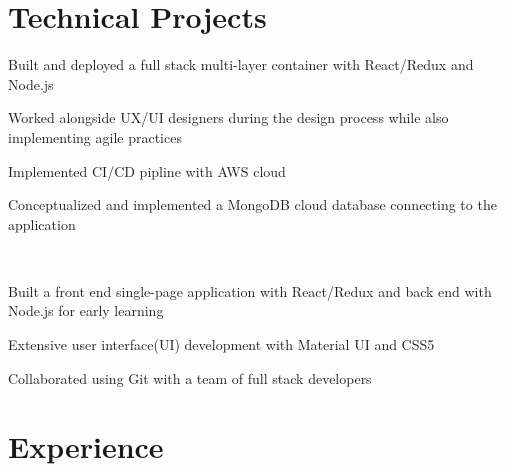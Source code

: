 \documentclass[]{deedy-resume-openfont}
\begin{document}
\hfill
\begin{minipage}[t]{4in} 


\section{Technical Projects}
\vspace{\topsep} %
\begin{tightemize}
\item Built and deployed a full stack multi-layer container with React/Redux and Node.js
\item Worked alongside UX/UI designers during the design process while also implementing agile practices
\item Implemented CI/CD pipline with AWS cloud
\item Conceptualized and implemented a MongoDB cloud database connecting to the application
\end{tightemize}
\sectionsep

 \\
\vspace{\topsep}
\begin{tightemize}
\item Built a front end single-page application with React/Redux and back end with Node.js for early learning \\
\item Extensive user interface(UI) development with Material UI and CSS5
\item Collaborated using Git with a team of full stack developers
\end{tightemize}
\sectionsep



\section{Experience}


\end{minipage}
\end{document}
